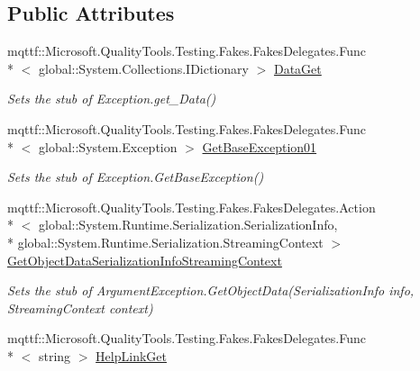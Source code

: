 \subsection*{Public Attributes}
\begin{DoxyCompactItemize}
\item 
mqttf\-::\-Microsoft.\-Quality\-Tools.\-Testing.\-Fakes.\-Fakes\-Delegates.\-Func\\*
$<$ global\-::\-System.\-Collections.\-I\-Dictionary $>$ \hyperlink{class_system_1_1_component_model_1_1_fakes_1_1_stub_invalid_asynchronous_state_exception_afe38c66e043229a31aa8781ac2f82d25}{Data\-Get}
\begin{DoxyCompactList}\small\item\em Sets the stub of Exception.\-get\-\_\-\-Data()\end{DoxyCompactList}\item 
mqttf\-::\-Microsoft.\-Quality\-Tools.\-Testing.\-Fakes.\-Fakes\-Delegates.\-Func\\*
$<$ global\-::\-System.\-Exception $>$ \hyperlink{class_system_1_1_component_model_1_1_fakes_1_1_stub_invalid_asynchronous_state_exception_ae31630be8d184655427a9a672236546c}{Get\-Base\-Exception01}
\begin{DoxyCompactList}\small\item\em Sets the stub of Exception.\-Get\-Base\-Exception()\end{DoxyCompactList}\item 
mqttf\-::\-Microsoft.\-Quality\-Tools.\-Testing.\-Fakes.\-Fakes\-Delegates.\-Action\\*
$<$ global\-::\-System.\-Runtime.\-Serialization.\-Serialization\-Info, \\*
global\-::\-System.\-Runtime.\-Serialization.\-Streaming\-Context $>$ \hyperlink{class_system_1_1_component_model_1_1_fakes_1_1_stub_invalid_asynchronous_state_exception_a44f28f931ce937f67f4219a55bd20630}{Get\-Object\-Data\-Serialization\-Info\-Streaming\-Context}
\begin{DoxyCompactList}\small\item\em Sets the stub of Argument\-Exception.\-Get\-Object\-Data(\-Serialization\-Info info, Streaming\-Context context)\end{DoxyCompactList}\item 
mqttf\-::\-Microsoft.\-Quality\-Tools.\-Testing.\-Fakes.\-Fakes\-Delegates.\-Func\\*
$<$ string $>$ \hyperlink{class_system_1_1_component_model_1_1_fakes_1_1_stub_invalid_asynchronous_state_exception_a48f4132ca6c70d604592b9146d0927ca}{Help\-Link\-Get}

\end{DoxyCompactItemize}
